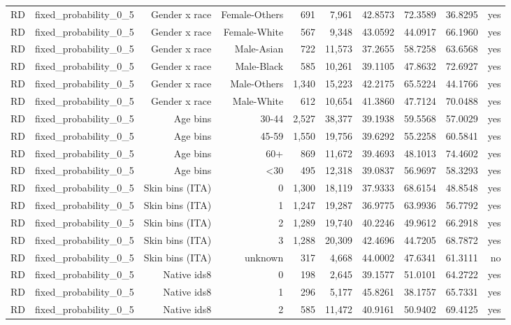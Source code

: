 \documentclass[10pt]{article}
\begin{document}
\begin{longtable}{@{}lrrrrrrrrr@{}}
RD & fixed\_probability\_0\_5 & Gender x race & Female-Others & 691 & 7,961 & 42.8573 & 72.3589 & 36.8295 & yes \\
RD & fixed\_probability\_0\_5 & Gender x race & Female-White & 567 & 9,348 & 43.0592 & 44.0917 & 66.1960 & yes \\
RD & fixed\_probability\_0\_5 & Gender x race & Male-Asian & 722 & 11,573 & 37.2655 & 58.7258 & 63.6568 & yes \\
RD & fixed\_probability\_0\_5 & Gender x race & Male-Black & 585 & 10,261 & 39.1105 & 47.8632 & 72.6927 & yes \\
RD & fixed\_probability\_0\_5 & Gender x race & Male-Others & 1,340 & 15,223 & 42.2175 & 65.5224 & 44.1766 & yes \\
RD & fixed\_probability\_0\_5 & Gender x race & Male-White & 612 & 10,654 & 41.3860 & 47.7124 & 70.0488 & yes \\
RD & fixed\_probability\_0\_5 & Age bins & 30-44 & 2,527 & 38,377 & 39.1938 & 59.5568 & 57.0029 & yes \\
RD & fixed\_probability\_0\_5 & Age bins & 45-59 & 1,550 & 19,756 & 39.6292 & 55.2258 & 60.5841 & yes \\
RD & fixed\_probability\_0\_5 & Age bins & 60+ & 869 & 11,672 & 39.4693 & 48.1013 & 74.4602 & yes \\
RD & fixed\_probability\_0\_5 & Age bins & \textless{}30 & 495 & 12,318 & 39.0837 & 56.9697 & 58.3293 & yes \\
RD & fixed\_probability\_0\_5 & Skin bins (ITA) & 0 & 1,300 & 18,119 & 37.9333 & 68.6154 & 48.8548 & yes \\
RD & fixed\_probability\_0\_5 & Skin bins (ITA) & 1 & 1,247 & 19,287 & 36.9775 & 63.9936 & 56.7792 & yes \\
RD & fixed\_probability\_0\_5 & Skin bins (ITA) & 2 & 1,289 & 19,740 & 40.2246 & 49.9612 & 66.2918 & yes \\
RD & fixed\_probability\_0\_5 & Skin bins (ITA) & 3 & 1,288 & 20,309 & 42.4696 & 44.7205 & 68.7872 & yes \\
RD & fixed\_probability\_0\_5 & Skin bins (ITA) & unknown & 317 & 4,668 & 44.0002 & 47.6341 & 61.3111 & no \\
RD & fixed\_probability\_0\_5 & Native ids8 & 0 & 198 & 2,645 & 39.1577 & 51.0101 & 64.2722 & yes \\
RD & fixed\_probability\_0\_5 & Native ids8 & 1 & 296 & 5,177 & 45.8261 & 38.1757 & 65.7331 & yes \\
RD & fixed\_probability\_0\_5 & Native ids8 & 2 & 585 & 11,472 & 40.9161 & 50.9402 & 69.4125 & yes \\

\end{longtable}
\end{document}

